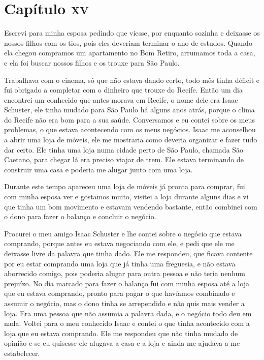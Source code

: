 \chapter{Capítulo \textsc{xv}}

Escrevi para minha esposa pedindo que viesse, por enquanto sozinha e
deixasse os nossos filhos com os tios, pois eles deveriam terminar o ano
de estudos. Quando ela chegou compramos um apartamento no Bom Retiro,
arrumamos toda a casa, e ela foi buscar nossos filhos e os trouxe para
São Paulo.

Trabalhava com o cinema, só que não estava dando certo, todo mês tinha
déficit e fui obrigado a completar com o dinheiro que trouxe do Recife.
Então um dia encontrei um conhecido que antes morava em Recife, o nome
dele era Isaac Schuster, ele tinha mudado para São Paulo há alguns anos
atrás, porque o clima do Recife não era bom para a sua saúde.
Conversamos e eu contei sobre os meus problemas, o que estava
acontecendo com os meus negócios. Isaac me aconselhou a abrir uma loja
de móveis, ele me mostraria como deveria organizar e fazer tudo dar
certo. Ele tinha uma loja numa cidade perto de São Paulo, chamada São
Caetano, para chegar lá era preciso viajar de trem. Ele estava
terminando de construir uma casa e poderia me alugar junto com uma loja.

Durante este tempo apareceu uma loja de móveis já pronta para comprar,
fui com minha esposa ver e gostamos muito, visitei a loja durante alguns
dias e vi que tinha um bom movimento e estavam vendendo bastante, então
combinei com o dono para fazer o balanço e concluir o negócio.

Procurei o meu amigo Isaac Schuster e lhe contei sobre o negócio que
estava comprando, porque antes eu estava negociando com ele, e pedi que
ele me deixasse livre da palavra que tinha dado. Ele me respondeu, que
ficava contente por eu estar comprando uma loja que já tinha uma
freguesia, e não estava aborrecido comigo, pois poderia alugar para
outra pessoa e não teria nenhum prejuízo. No dia marcado para fazer o
balanço fui com minha esposa até a loja que eu estava comprando, pronto
para pagar o que havíamos combinado e assumir o negócio, mas o dono
tinha se arrependido e não quis mais vender a loja. Era uma pessoa que
não assumia a palavra dada, e o negócio todo deu em nada. Voltei para o
meu conhecido Isaac e contei o que tinha acontecido com a loja que eu
estava comprando. Ele me respondeu que não tinha mudado de opinião e se
eu quisesse ele alugava a casa e a loja e ainda me ajudava a me
estabelecer.

